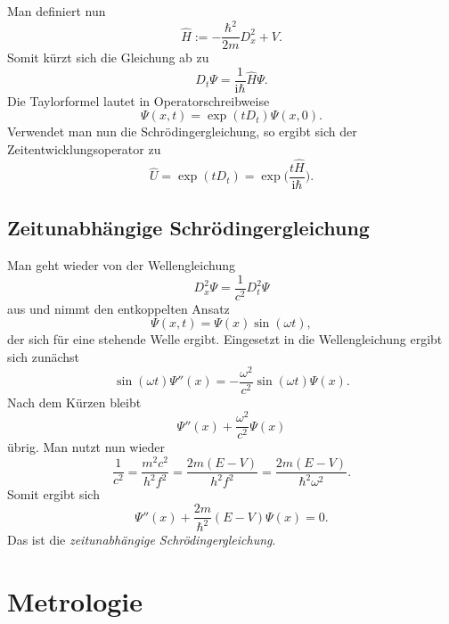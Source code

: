 \documentclass[a4paper,10pt,fleqn,twocolumn,twoside,dvipdfmx]{scrartcl}
\numberwithin{equation}{section}
\newcommand{\ui}{\mathrm i}
\begin{document}
Man definiert nun
\begin{equation}
\hat H := -\frac{\hbar^2}{2m}D_x^2+V.
\end{equation}
Somit kürzt sich die Gleichung ab zu
\begin{equation}
D_t\Psi = \frac{1}{\ui\hbar}\hat H\Psi.
\end{equation}
Die Taylorformel lautet in Operatorschreibweise%
\begin{equation}
\Psi(x,t)=\exp(tD_t)\Psi(x,0).
\end{equation}
Verwendet man nun die Schrödingergleichung, so ergibt sich
der Zeitentwicklungsoperator zu%
\begin{equation}
\hat U = \exp(tD_t) = \exp\Big(\frac{t\hat H}{\ui\hbar}\Big).
\end{equation}

\subsection[Zeitunabhängige Schrödingergleichung]
{Zeitunabhängige\newline
Schrödingergleichung}

Man geht wieder von der Wellengleichung%
\begin{equation}
D_x^2\Psi=\frac{1}{c^2}D_t^2\Psi
\end{equation}
aus und nimmt den entkoppelten Ansatz%
\begin{equation}
\Psi(x,t)=\Psi(x)\sin(\omega t),
\end{equation}
der sich für eine stehende Welle ergibt. Eingesetzt in
die Wellengleichung ergibt sich zunächst%
\begin{equation}
\sin(\omega t)\Psi''(x)=-\frac{\omega^2}{c^2}\sin(\omega t)\Psi(x).
\end{equation}
Nach dem Kürzen bleibt
\begin{equation}
\Psi''(x) + \frac{\omega^2}{c^2}\Psi(x)
\end{equation}
übrig. Man nutzt nun wieder
\begin{equation}
\frac{1}{c^2} = \frac{m^2 c^2}{h^2 f^2}
= \frac{2m(E-V)}{h^2 f^2}
= \frac{2m(E-V)}{\hbar^2 \omega^2}.
\end{equation}
Somit ergibt sich
\begin{equation}
\Psi''(x) + \frac{2m}{\hbar^2}(E-V)\Psi(x) = 0.
\end{equation}
Das ist die \emph{zeitunabhängige Schrödingergleichung}.

\newpage
\section{Metrologie}
\end{document}

